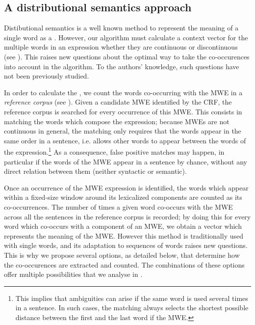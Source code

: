 \documentclass[output=paper,modfonts,nonflat]{langsci/langscibook}
\begin{document}


\subsection{A distributional semantics approach}
\label{subsec:semanticsApproach}

Distibutional semantics is a well known method to represent the
meaning of a single word as a 
\citep{schutze1998}. However, our algorithm must calculate a context
vector for the multiple words in an expression whether they are
continuous or discontinuous (see ).  This
raises new questions about the optimal way to take the co-occurences into
 account in the algorithm. To the authors’ knowledge, such
questions have not been previously studied.


In order to calculate the , we count the words
co-occurring with the MWE in a {\em reference corpus} (see
). Given a candidate MWE identified by the CRF,
the reference corpus is searched for every occurrence of this
MWE. This consists in matching the words which compose the expression;
because MWEs are not continuous in general, the matching only requires
that the words appear in the same order in a sentence, i.e. allows
other words to appear between the words of the
expression.\footnote{This implies that ambiguities can arise if the
  same word is used several times in a sentence. In such cases, the
  matching always selects the shortest possible distance between the
  first and the last word if the MWE.}  As a consequence, false
positive matches may happen, in particular if the words of the MWE
appear in a sentence by chance, without any direct relation between
them (neither syntactic or semantic).

Once an occurrence of the MWE expression is identified, the words
which appear within a fixed-size window around its lexicalized
components are counted as its co-occurrences. The number of times a
given word co-occurs with the MWE across all the sentences in the
reference corpus is recorded; by doing this for every word which
co-occurs with a component of an MWE, we obtain a vector which
represents the meaning of the MWE. However this
method is traditionally used with single words, and its adaptation to
sequences of words raises new questions. This is why we propose
several options, as detailed below, that determine how the
co-occurences are extracted and counted. The combinations of these
options offer multiple possibilities that we analyse in
.
\end{document}
